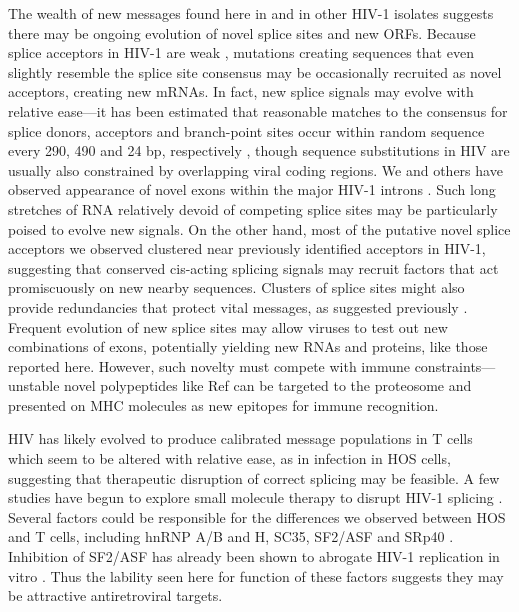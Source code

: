 \documentclass[../sherrill-Mix_thesis.tex]{subfiles}
\begin{document}
The wealth of new messages found here in \hivEight{} and in other HIV-1 isolates suggests there may be ongoing evolution of novel splice sites and new ORFs. Because splice acceptors in HIV-1 are weak \citep{Stoltzfus2009}, mutations creating sequences that even slightly resemble the \threePrime{} splice site consensus may be occasionally recruited as novel acceptors, creating new mRNAs. In fact, new splice signals may evolve with relative ease---it has been estimated that reasonable matches to the consensus for splice donors, acceptors and branch-point sites occur within random sequence every 290, 490 and 24 bp, respectively \citep{Burge1999}, though sequence substitutions in HIV are usually also constrained by overlapping viral coding regions. We and others have observed appearance of novel exons within the major HIV-1 introns \citep{Benko1990,Luetzelberger2006,Salfeld1990}. Such long stretches of RNA relatively devoid of competing splice sites may be particularly poised to evolve new signals. On the other hand, most of the putative novel splice acceptors we observed clustered near previously identified acceptors in HIV-1, suggesting that conserved cis-acting splicing signals may recruit factors that act promiscuously on new nearby sequences. Clusters of splice sites might also provide redundancies that protect vital messages, as suggested previously \citep{Abbink2008,Verhoef2001}. Frequent evolution of new splice sites may allow viruses to test out new combinations of exons, potentially yielding new RNAs and proteins, like those reported here. However, such novelty must compete with immune constraints---unstable novel polypeptides like Ref can be targeted to the proteosome and presented on MHC molecules as new epitopes for immune recognition.

HIV has likely evolved to produce calibrated message populations in T cells which seem to be altered with relative ease, as in infection in HOS cells, suggesting that therapeutic disruption of correct splicing may be feasible. A few studies have begun to explore small molecule therapy to disrupt HIV-1 splicing \citep{Bakkour2007,Tranell2011}. Several factors could be responsible for the differences we observed between HOS and T cells, including hnRNP A/B and H, SC35, SF2/ASF and SRp40 \citep{Caputi2004,Zahler2004}. Inhibition of SF2/ASF has already been shown to abrogate HIV-1 replication in vitro \citep{Bakkour2007}. Thus the lability seen here for function of these factors suggests they may be attractive antiretroviral targets. 
\end{document}
